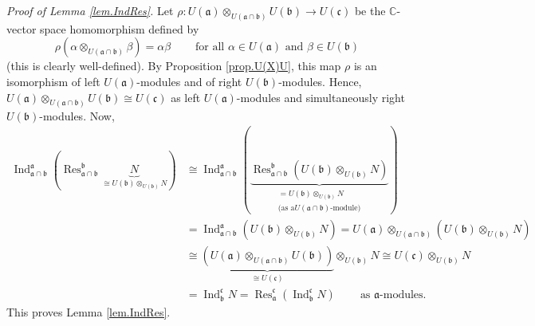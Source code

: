 \documentclass[etingof-lie.tex]{subfiles}
\begin{document}
\textit{Proof of Lemma \ref{lem.IndRes}.} Let $\rho:U\left(  \mathfrak{a}%
\right)  \otimes_{U\left(  \mathfrak{a}\cap\mathfrak{b}\right)  }U\left(
\mathfrak{b}\right)  \rightarrow U\left(  \mathfrak{c}\right)  $ be the
$\mathbb{C}$-vector space homomorphism defined by%
\[
\rho\left(  \alpha\otimes_{U\left(  \mathfrak{a}\cap\mathfrak{b}\right)
}\beta\right)  =\alpha\beta\ \ \ \ \ \ \ \ \ \ \text{for all }\alpha\in
U\left(  \mathfrak{a}\right)  \text{ and }\beta\in U\left(  \mathfrak{b}%
\right)
\]
(this is clearly well-defined). By Proposition \ref{prop.U(X)U}, this map
$\rho$ is an isomorphism of left $U\left(  \mathfrak{a}\right)  $-modules and
of right $U\left(  \mathfrak{b}\right)  $-modules. Hence, $U\left(
\mathfrak{a}\right)  \otimes_{U\left(  \mathfrak{a}\cap\mathfrak{b}\right)
}U\left(  \mathfrak{b}\right)  \cong U\left(  \mathfrak{c}\right)  $ as left
$U\left(  \mathfrak{a}\right)  $-modules and simultaneously right $U\left(
\mathfrak{b}\right)  $-modules. Now,%
\begin{align*}
\operatorname*{Ind}\nolimits_{\mathfrak{a}\cap\mathfrak{b}}^{\mathfrak{a}%
}\left(  \operatorname*{Res}\nolimits_{\mathfrak{a}\cap\mathfrak{b}%
}^{\mathfrak{b}}\underbrace{N}_{\cong U\left(  \mathfrak{b}\right)
\otimes_{U\left(  \mathfrak{b}\right)  }N}\right)   &  \cong%
\operatorname*{Ind}\nolimits_{\mathfrak{a}\cap\mathfrak{b}}^{\mathfrak{a}%
}\left(  \underbrace{\operatorname*{Res}\nolimits_{\mathfrak{a}\cap
\mathfrak{b}}^{\mathfrak{b}}\left(  U\left(  \mathfrak{b}\right)
\otimes_{U\left(  \mathfrak{b}\right)  }N\right)  }_{\substack{=U\left(
\mathfrak{b}\right)  \otimes_{U\left(  \mathfrak{b}\right)  }N\\\text{(as a
}U\left(  \mathfrak{a}\cap\mathfrak{b}\right)  \text{-module)}}}\right) \\
&  =\operatorname*{Ind}\nolimits_{\mathfrak{a}\cap\mathfrak{b}}^{\mathfrak{a}%
}\left(  U\left(  \mathfrak{b}\right)  \otimes_{U\left(  \mathfrak{b}\right)
}N\right)  =U\left(  \mathfrak{a}\right)  \otimes_{U\left(  \mathfrak{a}%
\cap\mathfrak{b}\right)  }\left(  U\left(  \mathfrak{b}\right)  \otimes
_{U\left(  \mathfrak{b}\right)  }N\right) \\
&  \cong\underbrace{\left(  U\left(  \mathfrak{a}\right)  \otimes_{U\left(
\mathfrak{a}\cap\mathfrak{b}\right)  }U\left(  \mathfrak{b}\right)  \right)
}_{\cong U\left(  \mathfrak{c}\right)  }\otimes_{U\left(  \mathfrak{b}\right)
}N\cong U\left(  \mathfrak{c}\right)  \otimes_{U\left(  \mathfrak{b}\right)
}N\\
&  =\operatorname*{Ind}\nolimits_{\mathfrak{b}}^{\mathfrak{c}}%
N=\operatorname*{Res}\nolimits_{\mathfrak{a}}^{\mathfrak{c}}\left(
\operatorname*{Ind}\nolimits_{\mathfrak{b}}^{\mathfrak{c}}N\right)
\ \ \ \ \ \ \ \ \ \ \text{as }\mathfrak{a}\text{-modules.}%
\end{align*}
This proves Lemma \ref{lem.IndRes}.
\end{document}
